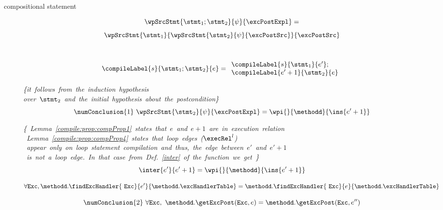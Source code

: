 \begin{description}
       \item[compositional statement]
          
	     $$\wpSrcStmt{  \stmt_1 ;  \stmt_2 }{\psi}{\excPostExpl} = $$
	     $$\wpSrcStmt{\stmt_1 }{\wpSrcStmt{\stmt_2 }{\psi }{ \excPostSrc}} { \excPostSrc} $$
	     
		 \\
                 $$\compileLabel{s}{ \stmt_1 ;  \stmt_2}{e} =
		    \begin{array}{l}
	                \compileLabel{s}{\stmt_1}{e'};\\
			\compileLabel{e'+1}{\stmt_2}{e}
	            \end{array}$$

	       \mbox{\rm\textit{\{it follows from  the induction hypothesis }}\\
	       \mbox{\rm\textit{over $\stmt_2$ and the initial hypothesis about the postcondition\}}} 
	       $$ \numConclusion{1} \    \wpSrcStmt{  \stmt_2 }{   \psi }{\excPostExpl } = \wpi{}{\methodd}{\ins{e'+1}} $$

	       \mbox{\rm\textit{\{
	       Lemma \ref{compile:prop:compProp1} states that $e$ and $e+1$ are in execution relation}}\\
	      \mbox{\rm\textit{ Lemma \ref{compile:prop:compProp4} states that loop edges ($\execRel^{l}$) }} \\
	       \mbox{\rm\textit{  appear only on loop statement compilation and thus, the edge between  $e'$ and $e' + 1$}}\\
	       \mbox{\rm\textit{ is not a loop edge. In that case from Def. \ref{inter}  of the function \interOnly{} we get \}  }} \\
	        $$\inter{e'}{e'+1} = \wpi{}{\methodd}{\ins{e'+1}} $$

	         $$ \forall  \mbox{\rm\texttt{Exc}}, \methodd.\findExcHandler{\mbox{ \rm \texttt{Exc}}  }{e'}{\methodd.\excHandlerTable} = \\
		                                 \methodd.\findExcHandler{\mbox{ \rm \texttt{Exc}}  }{e}{\methodd.\excHandlerTable}   $$
	       
                $$ \numConclusion{2} \               \forall \mbox{\rm\texttt{Exc}}, \ \methodd.\getExcPost(\mbox{\rm\texttt{Exc}}, e ) =  
                                                                                   \methodd.\getExcPost(\mbox{\rm\texttt{Exc}}, e'' ) $$ 
										   

\end{description}
